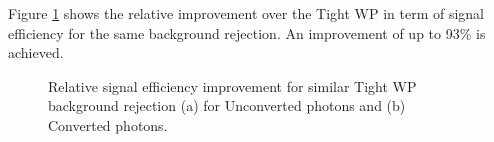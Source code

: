 Figure \ref{fig:gamma:CNN:Validation:Imp} shows the relative improvement over the Tight WP in term of signal efficiency for the same background rejection. An improvement of up to 93\% is achieved. 
\begin{figure}[ht]
    \centering
    \caption{Relative signal efficiency improvement for similar Tight WP background rejection (a) for Unconverted photons and (b) Converted photons.}
    \label{fig:gamma:CNN:Validation:Imp}
\end{figure}

